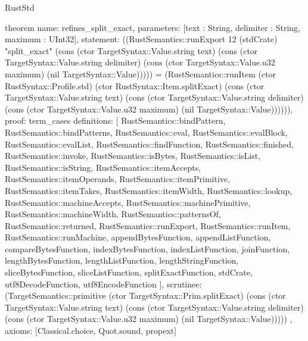 \begin{lexlean}{RustStd}
\begin{semanticmodule}
theorem{
  name: refines_split_exact,
  parameters: [text : String, delimiter : String, maximum : UInt32],
  statement: ((RustSemantics::runExport 12 (stdCrate) "split_exact" (cons (ctor TargetSyntax::Value.string text) (cons (ctor TargetSyntax::Value.string delimiter) (cons (ctor TargetSyntax::Value.u32 maximum) (nil TargetSyntax::Value))))) = (RustSemantics::runItem (ctor RustSyntax::Profile.std) (ctor RustSyntax::Item.splitExact) (cons (ctor TargetSyntax::Value.string text) (cons (ctor TargetSyntax::Value.string delimiter) (cons (ctor TargetSyntax::Value.u32 maximum) (nil TargetSyntax::Value)))))),
  proof: term_cases{
    definitions: [
      RustSemantics::bindPattern,
      RustSemantics::bindPatterns,
      RustSemantics::eval,
      RustSemantics::evalBlock,
      RustSemantics::evalList,
      RustSemantics::findFunction,
      RustSemantics::finished,
      RustSemantics::invoke,
      RustSemantics::isBytes,
      RustSemantics::isList,
      RustSemantics::isString,
      RustSemantics::itemAccepts,
      RustSemantics::itemOperands,
      RustSemantics::itemPrimitive,
      RustSemantics::itemTakes,
      RustSemantics::itemWidth,
      RustSemantics::lookup,
      RustSemantics::machineAccepts,
      RustSemantics::machinePrimitive,
      RustSemantics::machineWidth,
      RustSemantics::patternsOf,
      RustSemantics::returned,
      RustSemantics::runExport,
      RustSemantics::runItem,
      RustSemantics::runMachine,
      appendBytesFunction,
      appendListFunction,
      compareBytesFunction,
      indexBytesFunction,
      indexListFunction,
      joinFunction,
      lengthBytesFunction,
      lengthListFunction,
      lengthStringFunction,
      sliceBytesFunction,
      sliceListFunction,
      splitExactFunction,
      stdCrate,
      utf8DecodeFunction,
      utf8EncodeFunction
    ],
    scrutinee: (TargetSemantics::primitive (ctor TargetSyntax::Prim.splitExact) (cons (ctor TargetSyntax::Value.string text) (cons (ctor TargetSyntax::Value.string delimiter) (cons (ctor TargetSyntax::Value.u32 maximum) (nil TargetSyntax::Value)))))
  },
  axioms: [Classical.choice, Quot.sound, propext]
}


\end{semanticmodule}
\end{lexlean}
